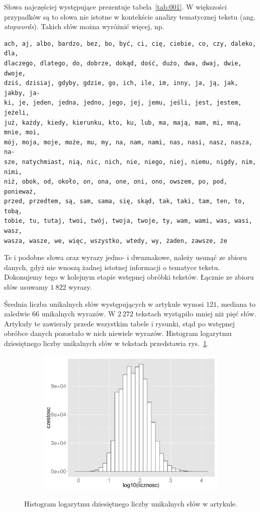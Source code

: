 \documentclass{praca1}
\begin{document}
Słowa najczęściej występujące prezentuje tabela~\ref{tab:001}. W większości przypadków są to słowa nie istotne w kontekście analizy tematycznej tekstu (ang. \emph{stopwords}). Takich słów można wyróżnić więcej, np.
\begin{verbatim}
ach, aj, albo, bardzo, bez, bo, być, ci, cię, ciebie, co, czy, daleko, dla,
dlaczego, dlatego, do, dobrze, dokąd, dość, dużo, dwa, dwaj, dwie, dwoje, 
dziś, dzisiaj, gdyby, gdzie, go, ich, ile, im, inny, ja, ją, jak, jakby, ja-
ki, je, jeden, jedna, jedno, jego, jej, jemu, jeśli, jest, jestem, jeżeli, 
już, każdy, kiedy, kierunku, kto, ku, lub, ma, mają, mam, mi, mną, mnie, moi,
mój, moja, moje, może, mu, my, na, nam, nami, nas, nasi, nasz, nasza, na-
sze, natychmiast, nią, nic, nich, nie, niego, niej, niemu, nigdy, nim, nimi,
niż, obok, od, około, on, ona, one, oni, ono, owszem, po, pod, ponieważ, 
przed, przedtem, są, sam, sama, się, skąd, tak, taki, tam, ten, to, tobą, 
tobie, tu, tutaj, twoi, twój, twoja, twoje, ty, wam, wami, was, wasi, wasz, 
wasza, wasze, we, więc, wszystko, wtedy, wy, żaden, zawsze, że
\end{verbatim}

Te i podobne słowa oraz wyrazy jedno- i dwuznakowe, należy usunąć ze zbioru danych, gdyż nie wnoszą żadnej istotnej informacji o tematyce tekstu. Dokonujemy tego w kolejnym etapie wstępnej obróbki tekstów. Łącznie ze zbioru słów usuwamy $1\ 822$ wyrazy.

Średnia liczba unikalnych słów występujących w artykule wynosi $121$, mediana to zaledwie $66$ unikalnych wyrazów. W $2\ 272$ tekstach wystąpiło mniej niż pięć słów. Artykuły te zawierały przede wszystkim tabele i rysunki, stąd po wstępnej obróbce danych pozostało w nich niewiele wyrazów. Histogram logarytmu dziesiętnego liczby unikalnych słów w tekstach przedstawia rys.~\ref{plot:004}.

\begin{figure}[!h]
  \centering
  \includegraphics[width=350pt, height=200pt]{plot4.pdf}\\
  \caption{Histogram logarytmu dziesiętnego liczby unikalnych słów w artykule.}\label{plot:004}
\end{figure}
\end{document}
